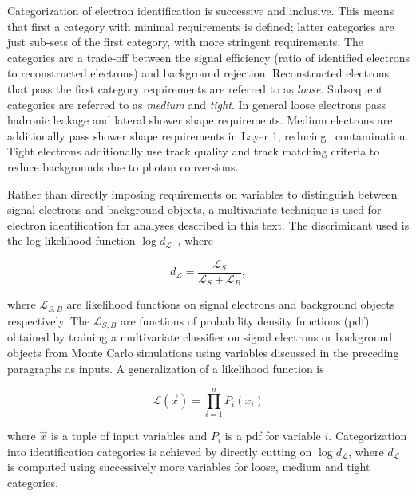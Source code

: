\par Categorization of electron identification is successive and inclusive. This means that first 
a category with minimal requirements is defined; latter categories are just sub-sets of the first 
category, with more stringent requirements. The categories are a trade-off between the signal 
efficiency (ratio of identified electrons to reconstructed electrons) and background 
rejection. Reconstructed electrons that pass the first category requirements are referred to 
as {\it loose}. Subsequent categories are referred to as {\it medium} and {\it tight}. 
In general loose electrons pass hadronic leakage and lateral shower shape requirements.   
Medium electrons are additionally pass shower shape requirements in Layer 1, reducing 
\pizero\ contamination. Tight electrons additionally use track quality and track matching criteria 
to reduce backgrounds due to photon conversions. 

\par Rather than directly imposing requirements 
on variables to distinguish between signal electrons and 
background objects, a multivariate technique is used for electron identification for analyses described in 
this text. The discriminant used is the log-likelihood function $\log{d_{\mathcal{L}}}$~\cite{ATLAS-CONF-2014-032}, 
where 

\begin{equation}
d_{\mathcal{L}} = \frac{\mathcal{L}_S}{\mathcal{L}_S + \mathcal{L}_B}, 
\label{eq:lglh}
\end{equation}

where $\mathcal{L}_{S,B}$ are likelihood functions on signal electrons and background objects 
respectively. The $\mathcal{L}_{S,B}$ are functions of probability density functions (pdf) obtained by training a 
multivariate classifier on signal electrons or background objects from Monte Carlo simulations  
using variables discussed in the preceding paragraphs as inputs. A generalization of 
a likelihood function is 

\begin{equation}
\mathcal{L}(\vec{x}) = \prod_{i=1}^{n} P_i(x_i)
\label{eq:lhf} 
\end{equation}

where $\vec{x}$ is a tuple of input variables and $P_i$ is a pdf for variable $i$. 
Categorization into identification categories is achieved by directly cutting on 
$\log{d_{\mathcal{L}}}$, where $d_{\mathcal{L}}$ is computed using successively 
more variables for loose, medium and tight categories.
 
